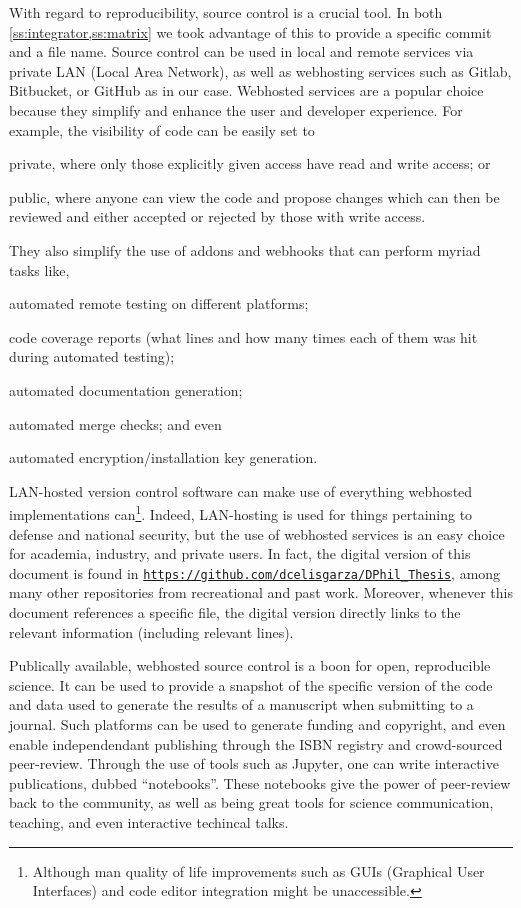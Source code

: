 With regard to reproducibility, source control is a crucial tool. In both \cref{ss:integrator,ss:matrix} we took advantage of this to provide a specific commit and a file name. Source control can be used in local and remote services via private LAN (Local Area Network), as well as webhosting services such as Gitlab, Bitbucket, or GitHub as in our case. Webhosted services are a popular choice because they simplify and enhance the user and developer experience. For example, the visibility of code can be easily set to
\begin{inparaenum}
    \item private, where only those explicitly given access have read and write access; or
    \item public, where anyone can view the code and propose changes which can then be reviewed and either accepted or rejected by those with write access.
\end{inparaenum}
They also simplify the use of addons and webhooks that can perform myriad tasks like,
\begin{inparaenum}
    \item automated remote testing on different platforms;
    \item code coverage reports (what lines and how many times each of them was hit during automated testing);
    \item automated documentation generation;
    \item automated merge checks; and even
    \item automated encryption/installation key generation.
\end{inparaenum}

LAN-hosted version control software can make use of everything webhosted implementations can\footnote{Although man quality of life improvements such as GUIs (Graphical User Interfaces) and code editor integration might be unaccessible.}. Indeed, LAN-hosting is used for things pertaining to defense and national security, but the use of webhosted services is an easy choice for academia, industry, and private users. In fact, the digital version of this document is found in \href{https://github.com/dcelisgarza/DPhil_Thesis}{\texttt{https://github.com/dcelisgarza/DPhil\_Thesis}}, among many other repositories from recreational and past work. Moreover, whenever this document references a specific file, the digital version directly links to the relevant information (including relevant lines).

Publically available, webhosted source control is a boon for open, reproducible science. It can be used to provide a snapshot of the specific version of the code and data used to generate the results of a manuscript when submitting to a journal. Such platforms can be used to generate funding and copyright, and even enable independendant publishing through the ISBN registry and crowd-sourced peer-review. Through the use of tools such as Jupyter, one can write interactive publications, dubbed ``notebooks''. These notebooks give the power of peer-review back to the community, as well as being great tools for science communication, teaching, and even interactive techincal talks.

